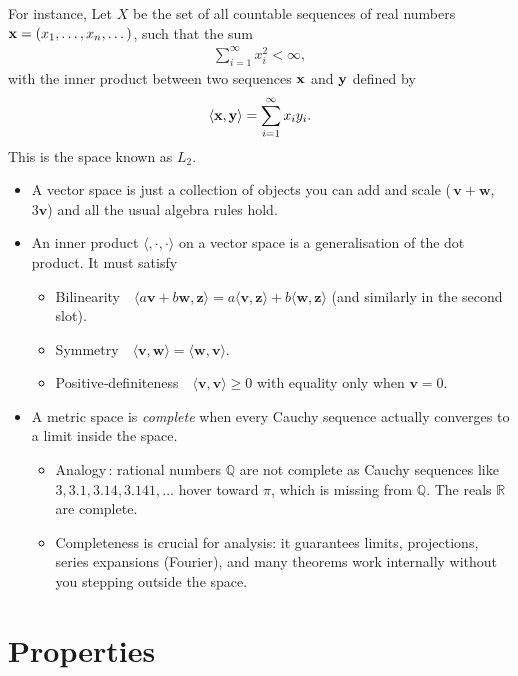 For instance, Let $X$ be the set of all countable sequences of real numbers ${\mathbf{x}} = (x_1,\dots, x_n, \dots)$, such that the sum 
\begin{align*}
	\sum_{i=1}^{\infty} x_i^2<\infty,
\end{align*}
with the inner product between two sequences ${\mathbf{x}}$ and ${\mathbf{y}}$ defined by
\begin{align*}
	\left<{\mathbf{x}}, {\mathbf{y}}\right> = \sum_{i=1}^{\infty} x_iy_i.
\end{align*}
This is the space known as $L_2$.

\begin{itemize}
	\item A vector space is just a collection of objects you can add and scale (\eg $\mathbf v + \mathbf w$, $3\mathbf v$) and all the usual algebra rules hold.
	\item An inner product $\langle,\cdot,\cdot\rangle$ on a vector space is a generalisation of the dot product. It must satisfy
		\begin{itemize}
			\item Bilinearity $\langle a\mathbf v + b\mathbf w,\mathbf z\rangle = a\langle\mathbf v,\mathbf z\rangle + b\langle\mathbf w,\mathbf z\rangle$ (and similarly in the second slot).
			\item Symmetry $\langle\mathbf v,\mathbf w\rangle = \langle\mathbf w,\mathbf v\rangle$.
			\item Positive‑definiteness $\langle\mathbf v,\mathbf v\rangle \ge 0$ with equality only when $\mathbf v=0$.
		\end{itemize}
	\item A metric space is \textit{complete} when every Cauchy sequence actually converges to a limit inside the space. 
		\begin{itemize}
			\item Analogy : rational numbers $\mathbb Q$ are not complete as Cauchy sequences like $3, 3.1, 3.14, 3.141,\dots$ hover toward $\pi$, which is missing from $\mathbb Q$. The reals $\mathbb R$ are complete. 
			\item Completeness is crucial for analysis: it guarantees limits, projections, series expansions (\eg Fourier), and many theorems work internally without you stepping outside the space.
		\end{itemize}
\end{itemize}





\section{Properties}

